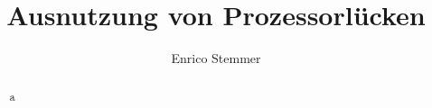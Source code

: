 \documentclass[12pt,a4paper]{article}
\title{\textbf{Ausnutzung von Prozessorlücken}}
\author{Enrico Stemmer}
\begin{document}
\maketitle
\thispagestyle{empty}

\begin{abstract}
	a
\end{abstract}

\newpage

\tableofcontents
\newpage




\newpage
\printbibliography
\end{document}
